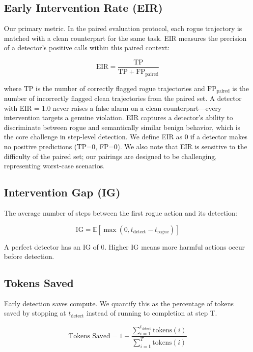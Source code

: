 \documentclass{article}
\begin{document}
\subsection{Early Intervention Rate (EIR)}

Our primary metric. In the paired evaluation protocol, each rogue trajectory is matched with a clean counterpart for the same task. EIR measures the precision of a detector's positive calls within this paired context:

\begin{equation}
\text{EIR} = \frac{\text{TP}}{\text{TP} + \text{FP}_{\text{paired}}}
\end{equation}

where TP is the number of correctly flagged rogue trajectories and $\text{FP}_{\text{paired}}$ is the number of incorrectly flagged clean trajectories from the paired set. A detector with EIR = 1.0 never raises a false alarm on a clean counterpart---every intervention targets a genuine violation. EIR captures a detector's ability to discriminate between rogue and semantically similar benign behavior, which is the core challenge in step-level detection. We define EIR as 0 if a detector makes no positive predictions (TP=0, FP=0). We also note that EIR is sensitive to the difficulty of the paired set; our pairings are designed to be challenging, representing worst-case scenarios.

\subsection{Intervention Gap (IG)}

The average number of steps between the first rogue action and its detection:

\begin{equation}
\text{IG} = \mathbb{E}[\max(0, t_{\text{detect}} - t_{\text{rogue}})]
\end{equation}

A perfect detector has an IG of 0. Higher IG means more harmful actions occur before detection.

\subsection{Tokens Saved}

Early detection saves compute. We quantify this as the percentage of tokens saved by stopping at $t_{\text{detect}}$ instead of running to completion at step T.

\begin{equation}
\text{Tokens Saved} = 1 - \frac{\sum_{i=1}^{t_{\text{detect}}} \text{tokens}(i)}{\sum_{i=1}^{T} \text{tokens}(i)}
\end{equation}
\end{document}
